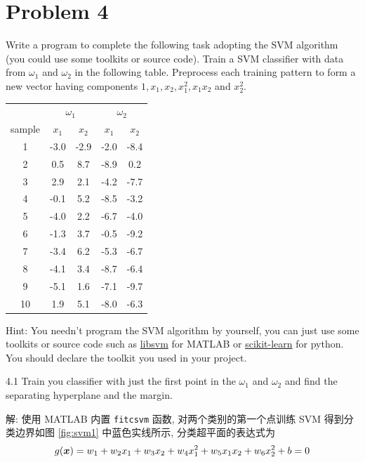 \documentclass{article}
\begin{document}
\section*{Problem 4}

Write a program to complete the following task adopting the SVM algorithm (you could use some toolkits or source code). Train a SVM classifier with data from $\omega_1$ and $\omega_2$ in the following table. Preprocess each training pattern to form a new vector having components $1,x_1,x_2,x_1^2,x_1x_2$ and $ x_2^2$.

\begin{table}[ht]
	\centering
	\begin{tabular}{ccccc}
		\hline
    ~&\multicolumn{2}{c}{$\omega_1$} & \multicolumn{2}{c}{$\omega_2$}\\
    \cmidrule(r){2-3} \cmidrule(r){4-5}
		sample & $x_1$ & $x_2$ & $x_1$ & $x_2$\\
		\hline
		1  & -3.0 & -2.9 & -2.0 & -8.4\\
		2  & 0.5  & 8.7 & -8.9 & 0.2\\
		3  & 2.9  & 2.1 & -4.2 & -7.7\\
		4  & -0.1 & 5.2 & -8.5 & -3.2\\
		5  & -4.0 & 2.2 & -6.7 & -4.0\\
		6  & -1.3 & 3.7 & -0.5 & -9.2\\
		7  & -3.4 & 6.2 & -5.3 & -6.7\\
		8  & -4.1 & 3.4 & -8.7 & -6.4\\
		9  & -5.1 & 1.6 & -7.1 & -9.7\\
		10 & 1.9  & 5.1 & -8.0 & -6.3\\
		\hline
	\end{tabular}
\end{table}

Hint: You needn't program the SVM algorithm by yourself, you can just use some toolkits or source code such as \href{http://www.csie.ntu.edu.tw/~cjlin/libsvm/}{libsvm} for MATLAB or \href{https://scikit-learn.org/stable/modules/svm.html#svm-classification}{scikit-learn} for python. You should declare the toolkit you used in your project.

4.1 Train you classifier with just the first point in the $\omega_1$ and $\omega_2$ and find the separating hyperplane and the margin.

解: 使用 MATLAB 内置 \verb|fitcsvm| 函数, 对两个类别的第一个点训练 SVM 得到分类边界如图 \ref{fig:svm1} 中蓝色实线所示, 分类超平面的表达式为
\begin{equation}
  g(\bm{x})=w_1+w_2x_1+w_3x_2+w_4x_1^2+w_5x_1x_2+w_6x_2^2+b=0
\end{equation}
\end{document}
